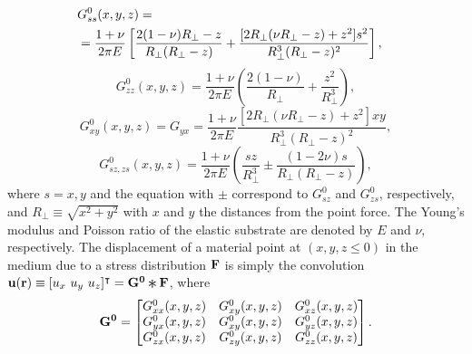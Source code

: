 \documentclass[aps,prl,reprint,twocolumn,groupedaddress,showpacs]{revtex4-1}
\def\r{{\bf r}}
\def\u{{\bf u}}
\def\F{{\bf F}}
\def\F{{\bf F}}
\newcommand{\Conv}{\mathop{\scalebox{1.5}{\raisebox{-0.2ex}{$\ast$}}}}%
\begin{document}
\begin{align}
\lefteqn{G^0_{ss}(x,y,z) = }\nonumber\\
&=\frac{1+\nu}{2\pi E}\left[\frac{2(1-\nu)R_{\perp}-z}{R_{\perp}(R_{\perp}-z)} + 
\frac{[2R_{\perp}(\nu R_{\perp}-z)+z^{2}]s^{2}}{R_{\perp}^{3}(R_{\perp}-z)^{2}}\right],
\end{align}
\begin{equation}
G^0_{zz}(x,y,z) =\frac{1+\nu}{2\pi E}\left(\frac{2(1-\nu)}{R_{\perp}}+\frac{z^{2}}{R_{\perp}^{3}}\right),
\end{equation}
\begin{equation} 
G^0_{xy}(x,y,z) = G_{yx}=\frac{1+\nu}{2\pi E}\frac{[2R_{\perp}(\nu R_{\perp}-z)+z^{2}]xy}{R_{\perp}^{3}
(R_{\perp}-z)^{2}},
\end{equation}
\begin{equation}
G^0_{sz, zs}(x,y,z) =\frac{1+\nu}{2\pi E}\left(\frac{sz}{R_{\perp}^{3}}\pm\frac{(1-2\nu)s}{R_{\perp}
(R_{\perp}-z)}\right),
\end{equation}
%
where $s=x,y$ and the equation with $\pm$ correspond to $G^0_{sz}$ and $G^0_{zs}$, respectively, 
and $R_{\perp} \equiv \sqrt{x^{2} +y^{2}}$ with $x$ and $y$ the distances from the 
point force. The Young's modulus and Poisson ratio of the elastic substrate are denoted by 
$E$ and $\nu$, respectively.   
The displacement of a material point at $(x,y,z\leq 0)$ in the medium due
to a stress distribution ${\bf F}$ is simply the convolution
$\u(\r) \equiv [u_x \ u_y\  u_z]^\intercal = {\bf G^0}\Conv\F$, where 
\begin{equation}
{\bf G^0} = \left[ \begin{matrix} G^0_{xx}(x,y,z) & G^0_{xy}(x,y,z) & G^0_{xz}(x,y,z) \\
	G^0_{yx}(x,y,z) & G^0_{xy}(x,y,z) & G^0_{yz}(x,y,z) \\
	G^0_{zx}(x,y,z) & G^0_{zy}(x,y,z) & G^0_{zz}(x,y,z) 
 \end{matrix} \right].
\end{equation}


\end{document}
